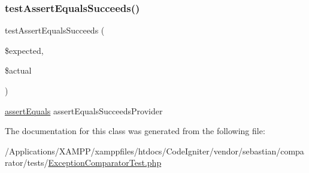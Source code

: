 \subsubsection{\texorpdfstring{test\+Assert\+Equals\+Succeeds()}{testAssertEqualsSucceeds()}}
{\footnotesize\ttfamily test\+Assert\+Equals\+Succeeds (\begin{DoxyParamCaption}\item[{}]{\$expected,  }\item[{}]{\$actual }\end{DoxyParamCaption})}

\mbox{\hyperlink{_functions_8php_a441ec5f09711b6271edda774132eec5f}{assert\+Equals}}  assert\+Equals\+Succeeds\+Provider 

The documentation for this class was generated from the following file\+:\begin{DoxyCompactItemize}
\item 
/\+Applications/\+X\+A\+M\+P\+P/xamppfiles/htdocs/\+Code\+Igniter/vendor/sebastian/comparator/tests/\mbox{\hyperlink{_exception_comparator_test_8php}{Exception\+Comparator\+Test.\+php}}\end{DoxyCompactItemize}
